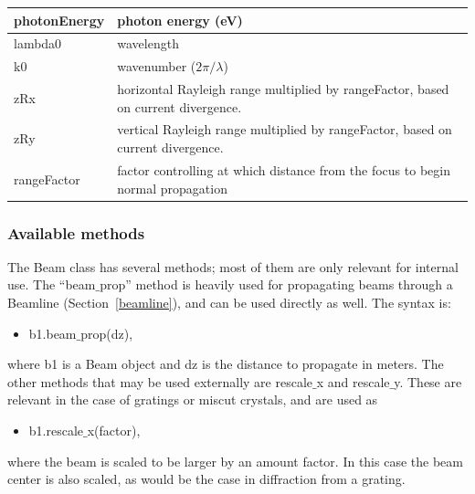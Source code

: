 \documentclass[11pt,fleqn]{article} %
\begin{document}
\begin{table}
\begin{center}
\begin{tabular}{ | p{2.5cm} || p{10cm} |}
      photonEnergy & photon energy (eV)\\\hline
      lambda0 & wavelength\\\hline
      k0 & wavenumber ($2\pi/\lambda$)\\\hline
      zRx & horizontal Rayleigh range multiplied by rangeFactor, based on current divergence.\\\hline
      zRy & vertical Rayleigh range multiplied by rangeFactor, based on current divergence.\\\hline
      rangeFactor & factor controlling at which distance from the focus to begin normal propagation\\\hline
    \end{tabular}
  \end{center}
\end{table}

\subsubsection{Available methods}
The Beam class has several methods; most of them are only relevant for internal use. The ``beam$\_$prop'' method is heavily used for propagating beams through a Beamline (Section~\ref{beamline}), and can be used directly as well. The syntax is:
\begin{itemize}[]
  \item b1.beam$\_$prop(dz),
\end{itemize}
where b1 is a Beam object and dz is the distance to propagate in meters. The other methods that may be used externally are rescale$\_$x and rescale$\_$y. These are relevant in the case of gratings or miscut crystals, and are used as
\begin{itemize}[]
  \item b1.rescale$\_$x(factor),
\end{itemize}
where the beam is scaled to be larger by an amount factor. In this case the beam center is also scaled, as would be the case in diffraction from a grating.
\end{document}
